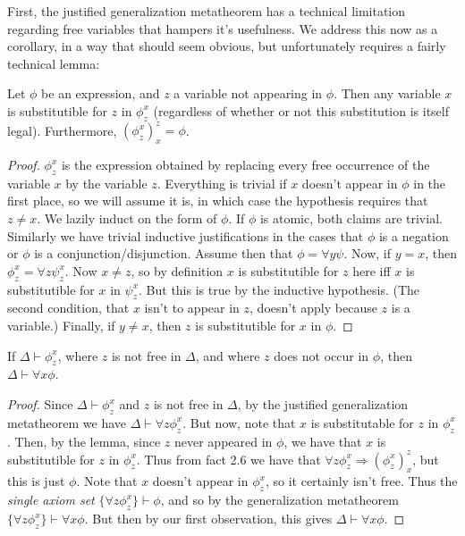 \par First, the justified generalization metatheorem has a technical limitation regarding free variables that hampers it's usefulness. We address this now as a corollary, in a way that should seem obvious, but unfortunately requires a fairly technical lemma:
\begin{lemma}
    Let $\phi$ be an expression, and $z$ a variable not appearing in $\phi$. Then any variable $x$ is substitutible for $z$ in $\phi_z^x$ (regardless of whether or not this substitution is itself legal). Furthermore, $(\phi_z^x)_x^z = \phi$.
\end{lemma}
\begin{proof}
    $\phi_z^x$ is the expression obtained by replacing every free occurrence of the variable $x$ by the variable $z$. Everything is trivial if $x$ doesn't appear in $\phi$ in the first place, so we will assume it is, in which case the hypothesis requires that $z \neq x$. We lazily induct on the form of $\phi$. If $\phi$ is atomic, both claims are trivial. Similarly we have trivial inductive justifications in the cases that $\phi$ is a negation or $\phi$ is a conjunction/disjunction. Assume then that $\phi = \forall y \psi$. Now, if $y = x$, then $\phi_z^x = \forall z \psi_z^x$. Now $x \neq z$, so by definition $x$ is substitutible for $z$ here iff $x$ is substitutible for $x$ in $\psi_z^x$. But this is true by the inductive hypothesis. (The second condition, that $x$ isn't to appear in $z$, doesn't apply because $z$ is a variable.) Finally, if $y \neq x$, then $z$ is substitutible for $x$ in $\phi$. 
\end{proof}
\begin{corollary}
    If $\Delta \vdash \phi_z^x$, where $z$ is not free in $\Delta$, and where $z$ does not occur in $\phi$, then $\Delta \vdash \forall x \phi$.
\end{corollary}
\begin{proof}
    Since $\Delta \vdash \phi_z^x$ and $z$ is not free in $\Delta$, by the justified generalization metatheorem we have $\Delta \vdash \forall z \phi_z^x$. But now, note that $x$ is substitutable for $z$ in $\phi_z^x$. Then, by the lemma, since $z$ never appeared in $\phi$, we have that $x$ is substitutible for $z$ in $\phi_z^x$. Thus from fact 2.6 we have that $\forall z \phi_z^x \Rightarrow (\phi_z^x)_x^z$, but this is just $\phi$. Note that $x$ doesn't appear in $\phi_z^x$, so it certainly isn't free. Thus the \textit{single axiom set} $\{ \forall z \phi_z^x \} \vdash \phi$, and so by the generalization metatheorem $\{ \forall z \phi_z^x \} \vdash \forall x \phi$. But then by our first observation, this gives $\Delta \vdash \forall x \phi$. 
\end{proof}
